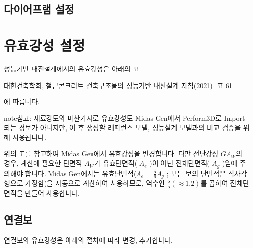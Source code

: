 \documentclass[a4paper,11pt,korean,openany,oneside]{sphinxmanual}
\begin{document}
\subsection{다이어프램 설정}
\label{\detokenize{1_support_setting:id4}}
\sphinxstepscope


\section{유효강성 설정}
\label{\detokenize{1_stiffness_setting:id1}}\label{\detokenize{1_stiffness_setting::doc}}
\sphinxAtStartPar
성능기반 내진설계에서의 유효강성은 아래의 표%
\begin{footnote}[1]\sphinxAtStartFootnote
대한건축학회, 철근콘크리트 건축구조물의 성능기반 내진설계 지침(2021) {[}표 6\sphinxhyphen{}1{]}
%
\end{footnote} 에 따릅니다.

\begin{figure}[htbp]
\centering
\capstart

\noindent{}
\caption{}\label{\detokenize{1_stiffness_setting:id10}}\end{figure}

\begin{sphinxadmonition}{note}{참고:}
\sphinxAtStartPar
재료강도와 마찬가지로 유효강성도 Midas Gen에서 Perform\sphinxhyphen{}3D로 Import되는 정보가 아니지만,
이 후 생성할 레퍼런스 모델, 성능설계 모델과의 비교 검증을 위해 사용됩니다.
\end{sphinxadmonition}

\sphinxAtStartPar
위의 표를 참고하여 Midas Gen에서 유효강성을 변경합니다. 다만 전단강성 \(GA_W\)의 경우, 계산에 필요한 단면적 \(A_W\)가
유효단면적( \(A_e\) )이 아닌 전체단면적( \(A_g\) )임에 주의해야 합니다.
Midas Gen에서는 유효단면적(\(A_e = \frac{5}{6}A_g\) ; 모든 보의 단면적은 직사각형으로 가정함)을 자동으로 계산하여 사용하므로,
역수인 \(\frac{6}{5}(\approx 1.2)\)를 곱하여 전체단면적을 만들어 사용합니다.


\subsection{연결보}
\label{\detokenize{1_stiffness_setting:id3}}
\sphinxAtStartPar
연결보의 유효강성은 아래의 절차에 따라 변경, 추가합니다.
\end{document}
